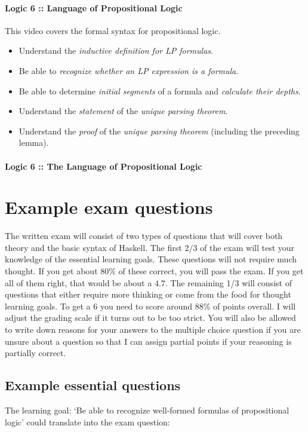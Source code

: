 \documentclass{article}[12pt]
\begin{document}
\paragraph{Logic 6 :: Language of Propositional Logic} This video covers the formal syntax for propositional logic.
\begin{itemize}    
    \item[\twemoji{slightly smiling face}] Understand the \emph{inductive definition for LP formulas}.
    \item[\twemoji{slightly smiling face}] Be able to \emph{recognize whether an LP expression is a formula}.
    \item[\twemoji{slightly smiling face}] Be able to determine \emph{initial segments} of a formula and \emph{calculate their depths}. 
    \item[\twemoji{slightly smiling face}] Understand the \emph{statement} of the \emph{unique parsing theorem}.
    \item[\twemoji{thinking face}] Understand the \emph{proof} of the \emph{unique parsing theorem} (including the preceding lemma).
\end{itemize}

\paragraph{Logic 6 :: The Language of Propositional Logic}

\section{Example exam questions}
The written exam will consist of two types of questions that will cover both theory and the basic syntax of Haskell. The first 2/3 of the exam will test your knowledge of the essential learning goals. These questions will not require much thought. If you get about 80\% of these correct, you will pass the exam. If you get all of them right, that would be about a $4.7$. The remaining 1/3 will consist of questions that either require more thinking or come from the food for thought learning goals. To get a $6$ you need to score around 88\% of points overall. I will adjust the grading scale if it turns out to be too strict. You will also be allowed to write down reasons for your answers to the multiple choice question if you are unsure about a question so that I can assign partial points if your reasoning is partially correct.

\subsection{Example essential questions}
The learning goal: `Be able to recognize well-formed formulas of propositional logic' could translate into the exam question:
\end{document}
